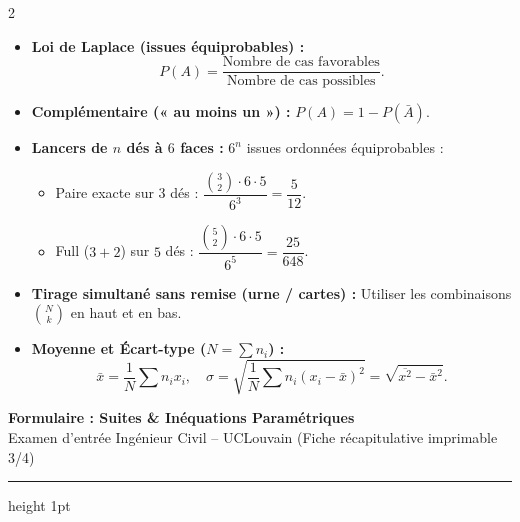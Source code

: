 {\begin{multicols}{2}
\vspace{3pt}
\begin{itemize}[leftmargin=1.2em, itemsep=1.5pt, topsep=2pt]
    \item \textbf{Loi de Laplace (issues équiprobables) :}
    \[
        P(A) = \frac{\text{Nombre de cas favorables}}{\text{Nombre de cas possibles}}.
    \]
    \item \textbf{Complémentaire (« au moins un ») :} $P(A) = 1 - P(\bar{A})$.
    \item \textbf{Lancers de $n$ dés à $6$ faces :} $6^n$ issues ordonnées équiprobables :
    \begin{itemize}[leftmargin=1em, itemsep=1pt]
        \item Paire exacte sur $3$ dés : $\dfrac{\binom{3}{2}\cdot 6 \cdot 5}{6^3} = \dfrac{5}{12}$.
        \item Full ($3+2$) sur $5$ dés : $\dfrac{\binom{5}{2}\cdot 6 \cdot 5}{6^5} = \dfrac{25}{648}$.
    \end{itemize}
    \item \textbf{Tirage simultané sans remise (urne / cartes) :} Utiliser les combinaisons $\binom{N}{k}$ en haut et en bas.
    \item \textbf{Moyenne et Écart-type ($N = \sum n_i$) :}
    \[
        \bar{x} = \frac{1}{N}\sum n_i x_i, \quad \sigma = \sqrt{\frac{1}{N}\sum n_i(x_i - \bar{x})^2} = \sqrt{\overline{x^2} - \bar{x}^2}.
    \]
\end{itemize}

\end{multicols}
}

\newpage
\thispagestyle{plain}

\begin{center}
    {\LARGE\bfseries\color{uclblue} Formulaire : Suites \& Inéquations Paramétriques}\\[2pt]
    {\small\color{darkgray} Examen d'entrée Ingénieur Civil -- UCLouvain (Fiche récapitulative imprimable 3/4)}
    \vspace{2pt}
    \hrule height 1pt
\end{center}
\vspace{-6pt}

